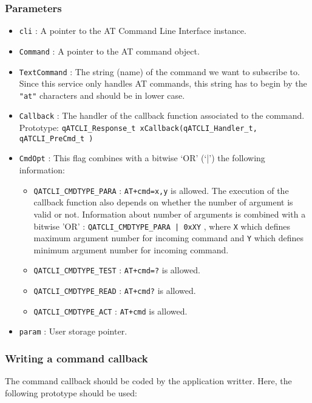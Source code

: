 \subsubsection*{Parameters}
\begin{itemize}
    \item \lstinline{cli} : A pointer to the AT Command Line Interface instance. 
    \item \lstinline{Command} :  A pointer to the AT command object.
    \item \lstinline{TextCommand} : The string (name) of the command we want to subscribe to. Since this service only handles AT commands, this string has to begin by the \lstinline{"at"} characters and should be in lower case.
    \item \lstinline{Callback} : The handler of the callback function associated to the command. Prototype: 
    \lstinline{qATCLI_Response_t xCallback(qATCLI_Handler_t, qATCLI_PreCmd_t )}
    \item \lstinline{CmdOpt} : This flag combines with a bitwise ‘OR’ (‘|’) the following information:
    \begin{itemize}
        \item \lstinline{QATCLI_CMDTYPE_PARA} : \lstinline{AT+cmd=x,y} is allowed. The execution of the callback function also depends on whether the number of argument is valid or not. Information about number of arguments is combined with a bitwise 'OR' : \lstinline{QATCLI_CMDTYPE_PARA | 0xXY} , where \lstinline{X} which defines maximum argument number for incoming command and \lstinline{Y} which defines minimum argument number for incoming command.
        \item \lstinline{QATCLI_CMDTYPE_TEST} : \lstinline{AT+cmd=?} is allowed. 
        \item \lstinline{QATCLI_CMDTYPE_READ} : \lstinline{AT+cmd?} is allowed. 
        \item \lstinline{QATCLI_CMDTYPE_ACT} : \lstinline{AT+cmd} is allowed. 
    \end{itemize}
    \item \lstinline{param} :  User storage pointer.
\end{itemize}

\subsubsection{Writing a command callback}
The command callback should be coded by the application writter. Here, the following prototype should be used:
\medskip

